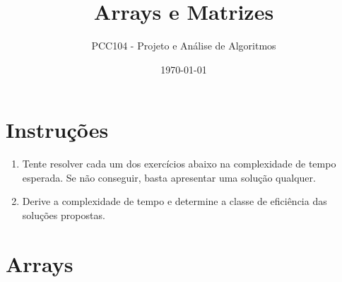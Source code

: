 \documentclass[a4paper,12pt]{article}
\begin{document}
\title{Arrays e Matrizes}
\author{PCC104 - Projeto e Análise de Algoritmos}
\date{\today}

\maketitle

\section*{Instruções}

\begin{enumerate}
    \item Tente resolver cada um dos exercícios abaixo na complexidade de tempo esperada. Se não conseguir, basta apresentar uma solução qualquer.
    \item Derive a complexidade de tempo e determine a classe de eficiência das soluções propostas.  
\end{enumerate}

\section{Arrays}
\end{document}
